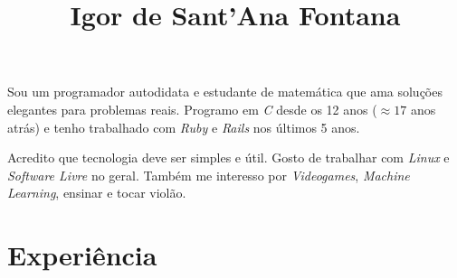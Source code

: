 \documentclass[a4paper]{simplecv}
\begin{document}


\title{Igor de Sant'Ana Fontana}

\maketitle

Sou um programador autodidata e estudante de matemática que ama soluções
elegantes para problemas reais. Programo em \emph{C} desde os 12 anos ($\approx
17$ anos atrás) e tenho trabalhado com \emph{Ruby} e \emph{Rails} nos últimos 5
anos.

Acredito que tecnologia deve ser simples e útil. Gosto de trabalhar com
\emph{Linux} e \emph{Software Livre} no geral. Também me interesso por
\emph{Videogames}, \emph{Machine Learning}, ensinar e tocar violão.

\section{Experiência}
\end{document}
